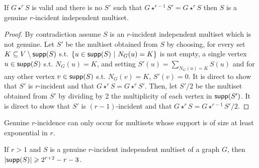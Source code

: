 \documentclass[a4paper,UKenglish,cleveref,autoref,thm-restate]{arxiv}
\newcommand{\se}{\subseteq}
\newcommand{\gs}{\geqslant}
\newcommand{\sm}{\setminus}
\newcommand{\supp}{\textup{\textsf{supp}}}
\begin{document}
\begin{proposition} \label{prop:nontrivial}
If $G\star^r S$ is valid and there is no $S'$ such that $G\star^{r-1} S' = G \star^r S$ then $S$ is a genuine $r$-incident independent multiset.    
\end{proposition}



\begin{proof} By contradiction assume $S$ is an $r$-incident independent multiset which is not genuine. Let $S'$ be the multiset obtained from $S$ by choosing, for every set $K \se V \sm \supp(S)$ s.t. $\{u \in \supp(S)~|~N_{G}(u)=K\}$ is not empty, a single vertex $u \in \supp(S)$ s.t. $N_{G}(u)=K$, and setting $S'(u)=\sum_{N_{G}(u)=K}S(u)$ and for any other vertex $v \in \supp(S)$ s.t. $N_{G}(v)=K$, $S'(v)=0$. It is direct to show that $S'$ is $r$-incident and that $G\star^r S = G\star^r S'$. Then, let $S'/2$ be the multiset obtained from $S'$ by dividing by 2 the multiplicity of each vertex in $\supp(S')$. It is direct to show that $S'$ is $(r-1)$-incident and that $G\star^r S= G\star^{r-1} S'/2$.   
\end{proof}

Genuine $r$-incidence can only occur for multisets whose support is of size at least exponential in $r$.

\begin{lemma} \label{lemma:exp_support}
    If $r>1$ and $S$ is a genuine $r$-incident independent multiset of a graph $G$, then $|\supp(S)| \gs 2^{r+2}-r-3$.
\end{lemma}
\end{document}
